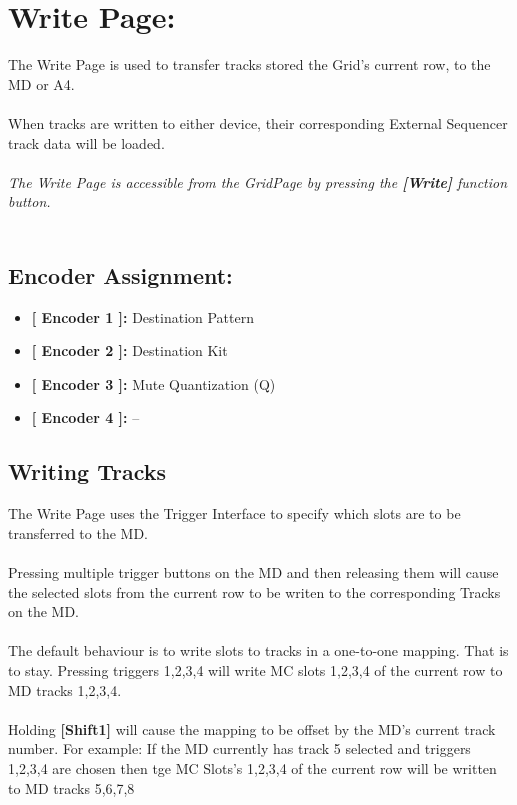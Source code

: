\chapter{Write Page:}

The Write Page is used to transfer tracks stored the Grid's current row, to the MD or A4.\\
\\
When tracks are written to either device, their corresponding External Sequencer track data will be loaded.
\\\\
\textit{The Write Page is accessible from the GridPage by pressing the  \textbf{[Write]} function button.}
\\\\
\section{Encoder Assignment:}
\begin{itemize}
	\item \textbf{[ Encoder 1 ]: }Destination Pattern
	\item \textbf{[ Encoder 2 ]: }Destination Kit
	\item \textbf{[ Encoder 3 ]: }Mute Quantization (Q)
	\item \textbf{[ Encoder 4 ]: }--
\end{itemize}
\section{Writing Tracks}
The Write Page uses the Trigger Interface to specify which slots are to be transferred to the MD.\\
\\
Pressing multiple trigger buttons on the MD and then releasing them will cause the selected slots from the current row to be writen to the corresponding Tracks on the MD.
\\
\\The default behaviour is to write slots to tracks in a one-to-one mapping. That is to stay. Pressing triggers 1,2,3,4 will write MC slots 1,2,3,4 of the current row to MD tracks 1,2,3,4.\\
\\
Holding  \textbf{[Shift1]} will cause the mapping to be offset by the MD's current track number. For example: If the MD currently has track 5 selected and triggers 1,2,3,4 are chosen then tge MC Slots's 1,2,3,4 of the current row will be written to MD tracks 5,6,7,8
